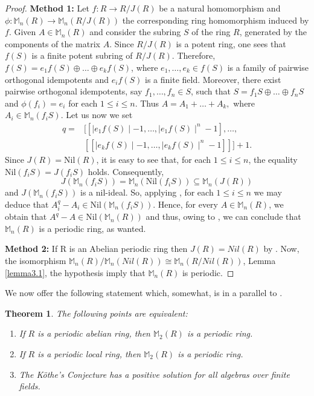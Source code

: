 \documentclass[12pt]{amsart}
\newtheorem{thm}{Theorem}[section]
\theoremstyle{definition}
\theoremstyle{remark}
\numberwithin{equation}{section}
\begin{document}
\begin{proof} 
\textbf{Method 1:} Let $f:R\to R/J(R)$ be a natural homomorphism and $\phi: \mathbb{M}_n(R)\to \mathbb{M}_n(R/J(R))$ the corresponding ring homomorphism induced by $f$. Given $A\in \mathbb{M}_n(R)$ and consider the subring $S$ of the ring $R$, generated by the components of the matrix $A$. Since $R/J(R)$ is a potent ring, one sees that $f(S)$ is a finite potent subring of $R/J(R)$. Therefore, $f(S)= e_1f(S)\oplus\ldots \oplus e_kf(S)$, where $e_1,\ldots, e_k\in f(S)$ is a family of pairwise orthogonal idempotents and $e_if (S)$ is a finite field. Moreover, there exist pairwise orthogonal idempotents, say $f_1,\ldots, f_n\in S$, such that $S= f_1S\oplus\ldots \oplus f_nS$ and $\phi(f_i)=e_i$ for each $1\leq i \leq n$. Thus $A=A_1+\ldots +A_k,$ where $A_i\in \mathbb{M}_n(f_iS)$. Let us now we set
\[\begin{split}
q=&[[\mid e_{1}f(S)\mid-1, \ldots, \mid e_{1}f(S)\mid^n-1],\ldots, \\
  &[[\mid e_{k}f(S)\mid-1, \ldots, \mid e_{k}f(S)\mid^n-1]]]+1.
\end{split}\]
Since $J(R)=\mathrm{Nil}(R)$, it is easy to see that, for each $1\leq i \leq n$, the equality $\mathrm{Nil}(f_iS)=J(f_iS)$ holds. Consequently, $$J(\mathbb{M}_n(f_iS))=\mathbb{M}_n(\mathrm{Nil}(f_iS))\subseteq \mathbb{M}_n(J(R))$$
and $J(\mathbb{M}_n(f_iS))$ is a nil-ideal. So, applying \cite[Theorem 8]{AT}, for each $1\leq i \leq n$ we may deduce that $A_i^{q}-A_i\in \mathrm{Nil}(\mathbb{M}_n(f_iS))$. Hence, for every $A\in \mathbb{M}_n(R)$, we obtain that $A^{q}-A\in \mathrm{Nil}(\mathbb{M}_n(R))$ and thus, owing to \cite[Theorem 3.4]{CD}, we can conclude that $\mathbb{M}_n(R)$ is a periodic ring, as wanted.

\textbf{Method 2:} 
If R is an Abelian periodic ring then $J(R)=Nil(R)$ by \cite[Lemma 5]{Badawi}. Now, the isomorphism $\mathbb{M}_n(R)/\mathbb{M}_n(Nil(R)) \cong \mathbb{M}_n(R/Nil(R))$, Lemma \ref{lemma3.1}, the hypothesis imply that $\mathbb{M}_n(R)$ is periodic.
\end{proof}

We now offer the following statement which, somewhat, is in a parallel to \cite{M}.

\begin{thm}\label{theorem2.7} The following points are equivalent:

\begin{enumerate}
\item[\rm{(1)}] If $R$ is a periodic abelian ring, then $\mathbb{M}_2(R)$ is a periodic ring.

\item[\rm{(2)}] If $R$ is a periodic local ring, then $\mathbb{M}_2(R)$ is a periodic ring.

\item[\rm{(3)}] The K\"othe's Conjecture has a positive solution for all algebras over finite fields.
\end{enumerate}
\end{thm}
\end{document}
